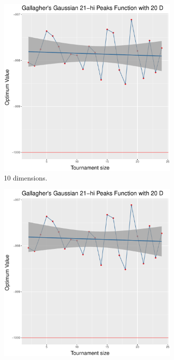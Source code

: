 \begin{figure}[t]
	\begin{subfigure}[b]{0.33\textwidth}
		\centering
		\includegraphics[width=\textwidth]{img/multimodal_uniform_22_dim_20.pdf}
		\caption{10 dimensions.}
	\end{subfigure}
	\begin{subfigure}[b]{0.33\textwidth}
		\centering
		\includegraphics[width=\textwidth]{img/multimodal_uniform_22_dim_20.pdf}

\end{subfigure}
\end{figure}
